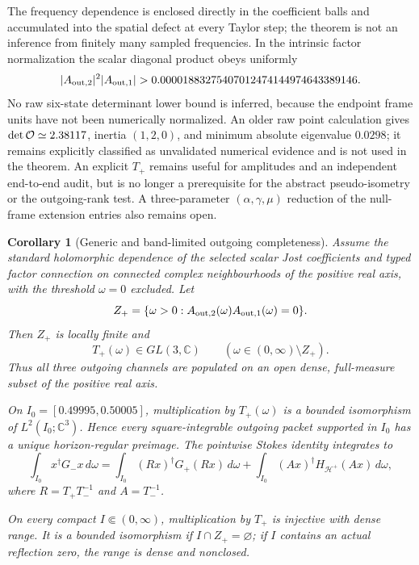 \documentclass[11pt]{article}
\newtheorem{corollary}[theorem]{Corollary}
\theoremstyle{definition}
\theoremstyle{remark}
\begin{document}
The frequency dependence is enclosed directly in the coefficient balls and
accumulated into the spatial defect at every Taylor step; the theorem is not
an inference from finitely many sampled frequencies.  In the intrinsic
factor normalization the scalar diagonal product obeys uniformly
\[
 |A_{{\rm out},2}|^2|A_{{\rm out},1}|
 >0.00001883275407012474144974643389146.
\]
No raw six-state determinant lower bound is inferred, because the endpoint
frame units have not been numerically normalized.  An older raw point
calculation gives \(\det{\cal O}\simeq2.38117\), inertia \((1,2,0)\), and
minimum absolute eigenvalue \(0.0298\); it remains explicitly classified as
unvalidated numerical evidence and is not used in the theorem.
An explicit \(T_+\) remains useful for amplitudes and an independent
end-to-end audit, but is no longer a prerequisite for the abstract
pseudo-isometry or the outgoing-rank test.  A three-parameter
\((\alpha,\gamma,\mu)\) reduction of the null-frame extension entries also
remains open.

\begin{corollary}[Generic and band-limited outgoing completeness]
\label{cor:axial-generic-outgoing-completeness}
Assume the standard holomorphic dependence of the selected scalar Jost
coefficients and typed factor connection on connected complex
neighbourhoods of the positive real axis, with the threshold
\(\omega=0\) excluded.  Let
\[
 Z_+=\{\omega>0:A_{{\rm out},2}(\omega)A_{{\rm out},1}(\omega)=0\}.
\]
Then \(Z_+\) is locally finite and
\[
 T_+(\omega)\in GL(3,\mathbb C)
 \qquad(\omega\in(0,\infty)\setminus Z_+).
\]
Thus all three outgoing channels are populated on an open dense,
full-measure subset of the positive real axis.

On \(I_0=[0.49995,0.50005]\), multiplication by \(T_+(\omega)\) is a
bounded isomorphism of \(L^2(I_0;\mathbb C^3)\).  Hence every
square-integrable outgoing packet supported in \(I_0\) has a unique
horizon-regular preimage.  The pointwise Stokes identity integrates to
\[
 \int_{I_0}x^\dagger G_-x\,d\omega
 =
 \int_{I_0}(Rx)^\dagger G_+(Rx)\,d\omega
 +
 \int_{I_0}(Ax)^\dagger H_{\mathcal H^+}(Ax)\,d\omega,
\]
where \(R=T_+T_-^{-1}\) and \(A=T_-^{-1}\).

On every compact \(I\Subset(0,\infty)\), multiplication by \(T_+\) is
injective with dense range.  It is a bounded isomorphism if
\(I\cap Z_+=\varnothing\); if \(I\) contains an actual reflection zero,
the range is dense and nonclosed.
\end{corollary}
\end{document}
